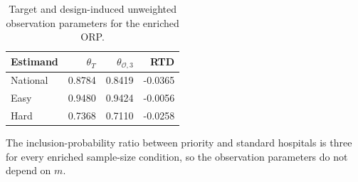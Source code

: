 \begin{table}[h!]
\centering
\small
\caption{Target and design-induced unweighted observation parameters for the enriched ORP.}
\label{tab:nav-observation-parameters}
\begin{tabular}{lrrr}
\toprule
Estimand & $\theta_T$ & $\theta_{\mathcal O,3}$ & RTD \\
\midrule
National & 0.8784 & 0.8419 & -0.0365 \\
Easy & 0.9480 & 0.9424 & -0.0056 \\
Hard & 0.7368 & 0.7110 & -0.0258 \\
\bottomrule
\end{tabular}
\par\vspace{2pt}
\begin{minipage}{0.97\linewidth}\footnotesize The inclusion-probability ratio between priority and standard hospitals is three for every enriched sample-size condition, so the observation parameters do not depend on $m$.\end{minipage}
\end{table}

